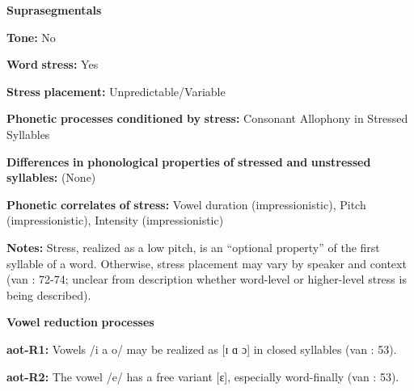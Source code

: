 \documentclass[output=paper]{langsci/langscibook}
\begin{document}
\begin{styleBody}
\textbf{Suprasegmentals}
\end{styleBody}

\begin{styleBody}
\textbf{Tone:} No
\end{styleBody}

\begin{styleBody}
\textbf{Word} \textbf{stress:} Yes
\end{styleBody}

\begin{styleBody}
\textbf{Stress} \textbf{placement:} Unpredictable/Variable
\end{styleBody}

\begin{styleBody}
\textbf{Phonetic} \textbf{processes} \textbf{conditioned} \textbf{by} \textbf{stress:} Consonant Allophony in Stressed Syllables
\end{styleBody}

\begin{styleBody}
\textbf{Differences} \textbf{in} \textbf{phonological} \textbf{properties} \textbf{of} \textbf{stressed} \textbf{and} \textbf{unstressed} \textbf{syllables:} (None)
\end{styleBody}

\begin{styleBody}
\textbf{Phonetic} \textbf{correlates} \textbf{of} \textbf{stress:} Vowel duration (impressionistic), Pitch (impressionistic), Intensity (impressionistic)
\end{styleBody}

\begin{styleBody}
\textbf{Notes:} Stress, realized as a low pitch, is an “optional property” of the first syllable of a word. Otherwise, stress placement may vary by speaker and context (van \citealt{Breugel2008}: 72-74; unclear from description whether word-level or higher-level stress is being described).
\end{styleBody}

\begin{styleBody}
\textbf{Vowel} \textbf{reduction} \textbf{processes}
\end{styleBody}

\begin{styleBody}
\textbf{aot-R1:} Vowels /i a o/ may be realized as [ɪ ɑ ɔ] in closed syllables (van \citealt{Breugel2008}: 53).
\end{styleBody}

\begin{styleBody}
\textbf{aot-R2:} The vowel /e/ has a free variant [ɛ], especially word-finally (van \citealt{Breugel2008}: 53).
\end{styleBody}
\end{document}
